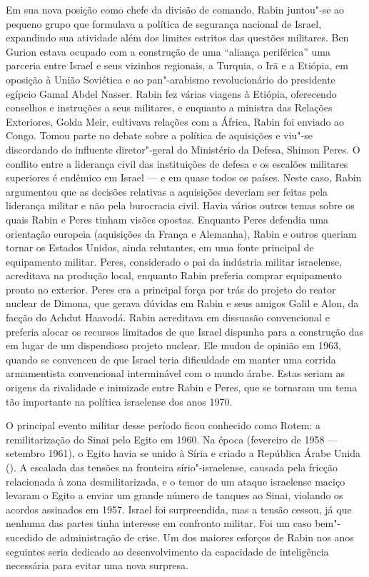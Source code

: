 Em sua nova posição como chefe da divisão de comando, Rabin juntou"-se ao
pequeno grupo que formulava a política de segurança nacional de Israel,
expandindo sua atividade além dos limites estritos das questões
militares. Ben Gurion estava ocupado com a construção de uma ``aliança
periférica'' uma parceria entre Israel e seus vizinhos regionais, a
Turquia, o Irã e a Etiópia, em oposição à União Soviética e ao
pan"-arabismo revolucionário do presidente egípcio Gamal Abdel Nasser.
Rabin fez várias viagens à Etiópia, oferecendo conselhos e instruções a
seus militares, e enquanto a ministra das Relações Exteriores, Golda Meir,
cultivava relações com a África, Rabin foi enviado ao Congo. Tomou parte
no debate sobre a política de aquisições e viu"-se discordando do
influente diretor"-geral do Ministério da Defesa, Shimon Peres. O
conflito entre a liderança civil das instituições de defesa e os
escalões militares superiores é endêmico em Israel --- e em quase todos
os países. Neste caso, Rabin argumentou que as decisões relativas a
aquisições deveriam ser feitas pela liderança militar e não pela
burocracia civil. Havia vários outros temas sobre os quais Rabin e Peres
tinham visões opostas. Enquanto Peres defendia uma orientação europeia
(aquisições da França e Alemanha), Rabin e outros queriam tornar os
Estados Unidos, ainda relutantes, em uma fonte principal de equipamento
militar. Peres, considerado o pai da indústria militar israelense,
acreditava na produção local, enquanto Rabin preferia comprar
equipamento pronto no exterior. Peres era a principal força por trás do
projeto do reator nuclear de Dimona, que gerava dúvidas em Rabin e seus
amigos Galil e Alon, da facção do Achdut Haavodá. Rabin acreditava em
dissuasão convencional e preferia alocar os recursos limitados de que
Israel dispunha para a construção das  em lugar de um dispendioso
projeto nuclear. Ele mudou de opinião em 1963, quando se convenceu de
que Israel teria dificuldade em manter uma corrida armamentista
convencional interminável com o mundo árabe. Estas seriam as origens da
rivalidade e inimizade entre Rabin e Peres, que se tornaram um tema tão
importante na política israelense dos anos 1970.

O principal evento militar desse período ficou conhecido como Rotem: a
remilitarização do Sinai pelo Egito em 1960. Na época (fevereiro de
1958 --- setembro 1961), o Egito havia se unido à Síria e criado a
República Árabe Unida (). A escalada das tensões na fronteira
sírio"-israelense, causada pela fricção relacionada à zona
desmilitarizada, e o temor de um ataque israelense maciço levaram o
Egito a enviar um grande número de tanques ao Sinai, violando os acordos
assinados em 1957. Israel foi surpreendida, mas a tensão cessou, já que
nenhuma das partes tinha interesse em confronto militar. Foi um caso bem"-sucedido
de administração de crise. Um dos maiores esforços de Rabin nos
anos seguintes seria dedicado ao desenvolvimento da capacidade de
inteligência necessária para evitar uma nova surpresa.

